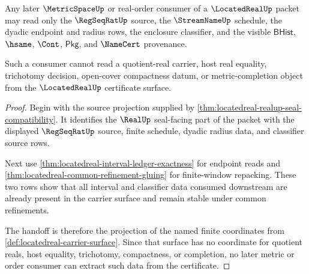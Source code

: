 \begin{theorem}
\label{thm:locatedreal-metric-consumer-handoff}
Any later $\MetricSpaceUp$ or real-order consumer of a $\LocatedRealUp$ packet may read only the $\RegSeqRatUp$ source, the $\StreamNameUp$ schedule, the dyadic endpoint and radius rows, the enclosure classifier, and the visible $\mathsf{BHist}$, $\hsame$, $\Cont$, $\mathsf{Pkg}$, and $\NameCert$ provenance.

Such a consumer cannot read a quotient-real carrier, host real equality, trichotomy decision, open-cover compactness datum, or metric-completion object from the $\LocatedRealUp$ certificate surface.
\end{theorem}
\begin{proof}
Begin with the source projection supplied by \autoref{thm:locatedreal-realup-seal-compatibility}. It identifies the $\RealUp$ seal-facing part of the packet with the displayed $\RegSeqRatUp$ source, finite schedule, dyadic radius data, and classifier source rows.

Next use \autoref{thm:locatedreal-interval-ledger-exactness} for endpoint reads and \autoref{thm:locatedreal-common-refinement-gluing} for finite-window repacking. These two rows show that all interval and classifier data consumed downstream are already present in the carrier surface and remain stable under common refinements.

The handoff is therefore the projection of the named finite coordinates from \autoref{def:locatedreal-carrier-surface}. Since that surface has no coordinate for quotient reals, host equality, trichotomy, compactness, or completion, no later metric or order consumer can extract such data from the certificate.
\end{proof}

